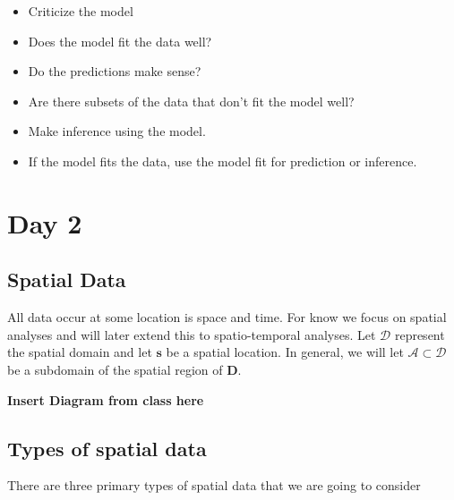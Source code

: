 \documentclass[]{book}
\begin{document}
\begin{itemize}
\item
  Criticize the model
\item
  Does the model fit the data well?
\item
  Do the predictions make sense?
\item
  Are there subsets of the data that don't fit the model well?
\item
  Make inference using the model.
\item
  If the model fits the data, use the model fit for prediction or inference.
\end{itemize}

\hypertarget{day-2}{%
\chapter{Day 2}\label{day-2}}

\hypertarget{spatial-data}{%
\section{Spatial Data}\label{spatial-data}}

All data occur at some location is space and time. For know we focus on spatial analyses and will later extend this to spatio-temporal analyses. Let \(\mathcal{D}\) represent the spatial domain and let \(\mathbf{s}\) be a spatial location. In general, we will let \(\mathcal{A} \subset \mathcal{D}\) be a subdomain of the spatial region of \(\mathbf{D}\).

\textbf{Insert Diagram from class here}

\hypertarget{types-of-spatial-data}{%
\section{Types of spatial data}\label{types-of-spatial-data}}

There are three primary types of spatial data that we are going to consider
\end{document}
